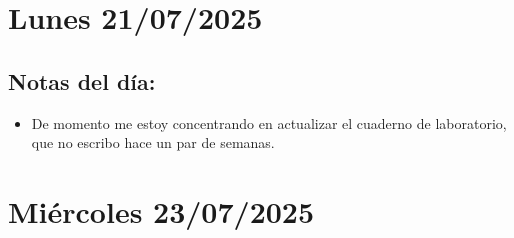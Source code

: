 \section{Lunes 21/07/2025} 
\subsection*{Notas del día:} 
\begin{itemize}
	\item De momento me estoy concentrando  en actualizar el cuaderno de laboratorio, que no escribo hace un par de semanas. 
\end{itemize}
 
\section{Miércoles 23/07/2025} 
